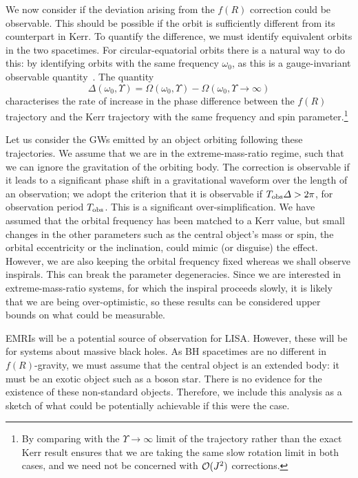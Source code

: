 We now consider if the deviation arising from the $f(R)$ correction could be observable. This should be possible if the orbit is sufficiently different from its counterpart in Kerr. To quantify the difference, we must identify equivalent orbits in the two spacetimes. For circular-equatorial orbits there is a natural way to do this: by identifying orbits with the same frequency $\omega_0$, as this is a gauge-invariant observable quantity~\cite{Detweiler2008}. The quantity
\begin{equation}
\Delta(\omega_0,\Upsilon) = \Omega(\omega_0,\Upsilon) - \Omega(\omega_0,\Upsilon \rightarrow \infty)
\end{equation}
characterises the rate of increase in the phase difference between the $f(R)$ trajectory and the Kerr trajectory with the same frequency and spin parameter.\footnote{By comparing with the $\Upsilon \rightarrow\infty$ limit of the trajectory rather than the exact Kerr result ensures that we are taking the same slow rotation limit in both cases, and we need not be concerned with $\mathcal{O}({J^2})$ corrections.}

Let us consider the GWs emitted by an object orbiting following these trajectories. We assume that we are in the extreme-mass-ratio regime, such that we can ignore the gravitation of the orbiting body. The correction is observable if it leads to a significant phase shift in a gravitational waveform over the length of an observation; we adopt the criterion that it is observable if $T_\mathrm{obs}\Delta > 2\pi$, for observation period $T_\mathrm{obs}$. This is a significant over-simplification. We have assumed that the orbital frequency has been matched to a Kerr value, but small changes in the other parameters such as the central object's mass or spin, the orbital eccentricity or the inclination, could mimic (or disguise) the effect. However, we are also keeping the orbital frequency fixed whereas we shall observe inspirals. This can break the parameter degeneracies. Since we are interested in extreme-mass-ratio systems, for which the inspiral proceeds slowly, it is likely that we are being over-optimistic, so these results can be considered upper bounds on what could be measurable.

EMRIs will be a potential source of observation for LISA. However, these will be for systems about massive black holes. As BH spacetimes are no different in $f(R)$-gravity, we must assume that the central object is an extended body: it must be an exotic object such as a boson star. There is no evidence for the existence of these non-standard objects. Therefore, we include this analysis as a sketch of what could be potentially achievable if this were the case.

